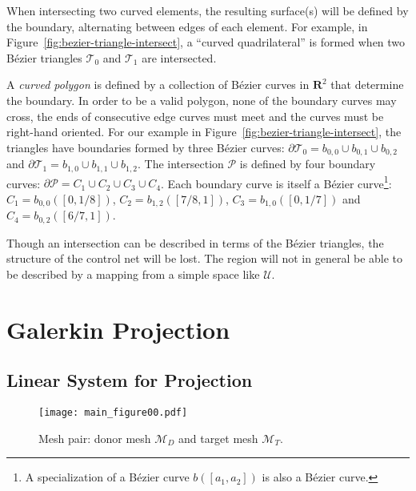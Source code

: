 \documentclass[oneside, reqno]{amsart}
\theoremstyle{definition}
\newcommand{\reals}{\mathbf{R}}
\newcommand{\utri}{\mathcal{U}}
\begin{document}
When intersecting two curved elements, the resulting surface(s) will
be defined by the boundary, alternating between edges of each
element.
For example, in Figure~\ref{fig:bezier-triangle-intersect}, a
``curved quadrilateral'' is formed when two B\'{e}zier triangles
\(\mathcal{T}_0\) and \(\mathcal{T}_1\) are intersected.

A \emph{curved polygon} is defined by a collection of B\'{e}zier curves
in \(\reals^2\) that determine the boundary. In order to be
a valid polygon, none of the boundary curves may cross, the
ends of consecutive edge curves must meet and the curves must be right-hand
oriented. For our example in
Figure~\ref{fig:bezier-triangle-intersect}, the triangles
have boundaries formed by three B\'{e}zier curves:
\(\partial \mathcal{T}_0 = b_{0, 0} \cup b_{0, 1} \cup b_{0, 2}\) and
\(\partial \mathcal{T}_1 = b_{1, 0} \cup b_{1, 1} \cup b_{1, 2}\).
The intersection \(\mathcal{P}\) is defined by four boundary
curves: \(\partial \mathcal{P} =
C_1 \cup C_2 \cup C_3 \cup C_4\). Each boundary
curve is itself a B\'{e}zier curve\footnote{A specialization of a
B\'{e}zier curve \(b\left(\left[a_1, a_2\right]\right)\)
is also a B\'{e}zier curve.}:
\(C_1 = b_{0, 0}\left(\left[0, 1/8\right]\right)\),
\(C_2 = b_{1, 2}\left(\left[7/8, 1\right]\right)\),
\(C_3 = b_{1, 0}\left(\left[0, 1/7\right]\right)\) and
\(C_4 = b_{0, 2}\left(\left[6/7, 1\right]\right)\).

Though an intersection can be described in terms of the B\'{e}zier triangles,
the structure of the control net will be lost. The region will not in general
be able to be described by a mapping from a simple space like
\(\utri\).

\section{Galerkin Projection}\label{sec:galerkin-projection}

\subsection{Linear System for Projection}

\begin{figure}
  \texttt{[image: main\_figure00.pdf]}
  \centering
  \captionsetup{width=.75\linewidth}
  \caption{Mesh pair: donor mesh \(\mathcal{M}_D\) and
    target mesh \(\mathcal{M}_T\).}
  \label{fig:donor-target-pair}
\end{figure}
\end{document}
